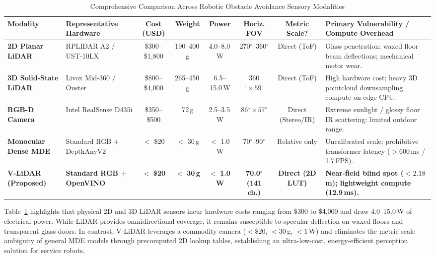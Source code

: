 \documentclass{ieeeaccess}
\begin{document}
\begin{table}[!t]
  \centering
  \footnotesize
  \caption{Comprehensive Comparison Across Robotic Obstacle Avoidance Sensory Modalities}
  \label{tab:sensory_comparison}
  \begin{tabularx}{\textwidth}{@{}p{2.2cm}p{2.4cm}cccccX@{}}
    \toprule
    Modality & Representative Hardware & Cost (USD) & Weight & Power & Horiz. FOV & Metric Scale? & Primary Vulnerability / Compute Overhead \\
    \midrule
    \textbf{2D Planar LiDAR} & RPLIDAR A2 / UST-10LX & \$300--\$1,800 & 190--400\,g & 4.0--8.0\,W & 270$^\circ$--360$^\circ$ & Direct (ToF) & Glass penetration; waxed floor beam deflections; mechanical motor wear. \\
    \textbf{3D Solid-State LiDAR} & Livox Mid-360 / Ouster & \$800--\$4,000 & 265--450\,g & 6.5--15.0\,W & 360$^\circ \times 59^\circ$ & Direct (ToF) & High hardware cost; heavy 3D pointcloud downsampling compute on edge CPU. \\
    \textbf{RGB-D Camera} & Intel RealSense D435i & \$350--\$500 & 72\,g & 2.5--3.5\,W & 86$^\circ \times 57^\circ$ & Direct (Stereo/IR) & Extreme sunlight / glossy floor IR scattering; limited outdoor range. \\
    \textbf{Monocular Dense MDE} & Standard RGB + DepthAnyV2 & $<$ \$20 & $<$ 30\,g & $<$ 1.0\,W & 70$^\circ$--90$^\circ$ & Relative only & Uncalibrated scale; prohibitive transformer latency ($>600$\,ms / 1.7\,FPS). \\
    \textbf{V-LiDAR (Proposed)} & \textbf{Standard RGB + OpenVINO} & $<$ \textbf{\$20} & $<$ \textbf{30\,g} & $<$ \textbf{1.0\,W} & \textbf{70.0$^\circ$ (141 ch.)} & \textbf{Direct (2D LUT)} & \textbf{Near-field blind spot ($<2.18$\,m); lightweight compute (12.9\,ms).} \\
    \bottomrule
  \end{tabularx}
\end{table}

Table~\ref{tab:sensory_comparison} highlights that physical 2D and 3D LiDAR sensors incur hardware costs ranging from \$300 to \$4,000 and draw 4.0--15.0\,W of electrical power. While LiDAR provides omnidirectional coverage, it remains susceptible to specular deflection on waxed floors and transparent glass doors. In contrast, V-LiDAR leverages a commodity camera ($<\$20$, $<30$\,g, $<1$\,W) and eliminates the metric scale ambiguity of general MDE models through precomputed 2D lookup tables, establishing an ultra-low-cost, energy-efficient perception solution for service robots.
\end{document}
